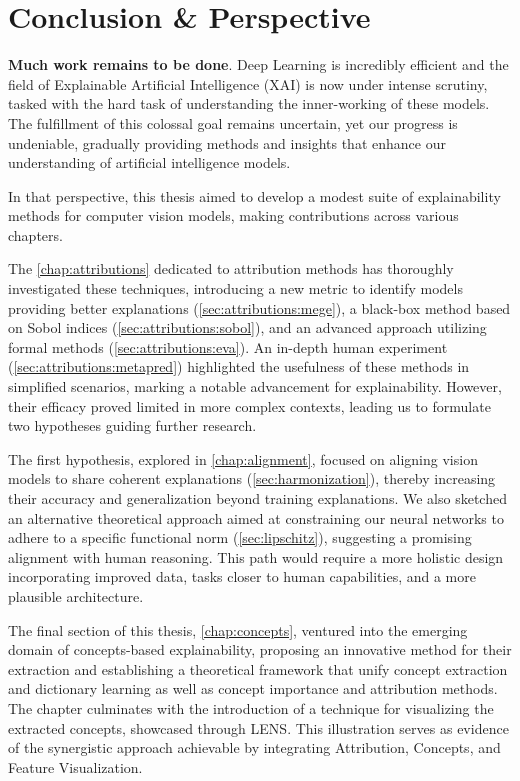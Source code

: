 \chapter{Conclusion \& Perspective}
\label{chap:conclusion}

\textbf{Much work remains to be done}. Deep Learning is incredibly efficient and the field of Explainable Artificial Intelligence (XAI) is now under intense scrutiny, tasked with the hard task of understanding the inner-working of these models. The fulfillment of this colossal goal remains uncertain, yet our progress is undeniable, gradually providing methods and insights that enhance our understanding of artificial intelligence models.

In that perspective, this thesis aimed to develop a modest suite of explainability methods for computer vision models, making contributions across various chapters.

The \autoref{chap:attributions} dedicated to attribution methods has thoroughly investigated these techniques, introducing a new metric to identify models providing better explanations (\autoref{sec:attributions:mege}), a black-box method based on Sobol indices (\autoref{sec:attributions:sobol}), and an advanced approach utilizing formal methods (\autoref{sec:attributions:eva}). An in-depth human experiment (\autoref{sec:attributions:metapred}) highlighted the usefulness of these methods in simplified scenarios, marking a notable advancement for explainability. However, their efficacy proved limited in more complex contexts, leading us to formulate two hypotheses guiding further research.

The first hypothesis, explored in \autoref{chap:alignment}, focused on aligning vision models to share coherent explanations (\autoref{sec:harmonization}), thereby increasing their accuracy and generalization beyond training explanations. We also sketched an alternative theoretical approach aimed at constraining our neural networks to adhere to a specific functional norm (\autoref{sec:lipschitz}), suggesting a promising alignment with human reasoning. This path would require a more holistic design incorporating improved data, tasks closer to human capabilities, and a more plausible architecture.

The final section of this thesis, \autoref{chap:concepts}, ventured into the emerging domain of concepts-based explainability, proposing an innovative method for their extraction and establishing a theoretical framework that unify concept extraction and dictionary learning as well as concept importance and attribution methods. The chapter culminates with the introduction of a technique for visualizing the extracted concepts, showcased through LENS. This illustration serves as evidence of the synergistic approach achievable by integrating Attribution, Concepts, and Feature Visualization.

